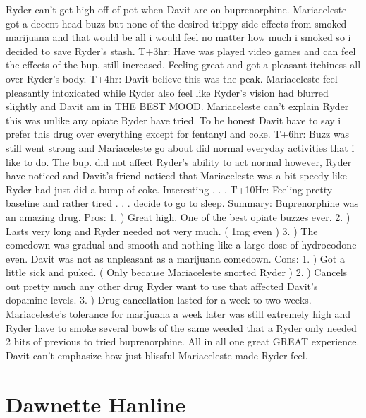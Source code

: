 \documentclass[12pt]{book}
\begin{document}
Ryder can't get high off of pot when Davit are on buprenorphine. Mariaceleste got a decent head buzz but none of the desired trippy side effects from smoked marijuana and that would be all i would feel no matter how much i smoked so i decided to save Ryder's stash. T+3hr: Have was played video games and can feel the effects of the bup. still increased. Feeling great and got a pleasant itchiness all over Ryder's body. T+4hr: Davit believe this was the peak. Mariaceleste feel pleasantly intoxicated while Ryder also feel like Ryder's vision had blurred slightly and Davit am in THE BEST MOOD. Mariaceleste can't explain Ryder this was unlike any opiate Ryder have tried. To be honest Davit have to say i prefer this drug over everything except for fentanyl and coke. T+6hr: Buzz was still went strong and Mariaceleste go about did normal everyday activities that i like to do. The bup. did not affect Ryder's ability to act normal however, Ryder have noticed and Davit's friend noticed that Mariaceleste was a bit speedy like Ryder had just did a bump of coke. Interesting . . .  T+10Hr: Feeling pretty baseline and rather tired . . .  decide to go to sleep. Summary: Buprenorphine was an amazing drug. Pros: 1. ) Great high. One of the best opiate buzzes ever. 2. ) Lasts very long and Ryder needed not very much. ( 1mg even ) 3. ) The comedown was gradual and smooth and nothing like a large dose of hydrocodone even. Davit was not as unpleasant as a marijuana comedown. Cons: 1. ) Got a little sick and puked. ( Only because Mariaceleste snorted Ryder ) 2. ) Cancels out pretty much any other drug Ryder want to use that affected Davit's dopamine levels. 3. ) Drug cancellation lasted for a week to two weeks. Mariaceleste's tolerance for marijuana a week later was still extremely high and Ryder have to smoke several bowls of the same weeded that a Ryder only needed 2 hits of previous to tried buprenorphine. All in all one great GREAT experience. Davit can't emphasize how just blissful Mariaceleste made Ryder feel.






\chapter{Dawnette Hanline}
\end{document}

